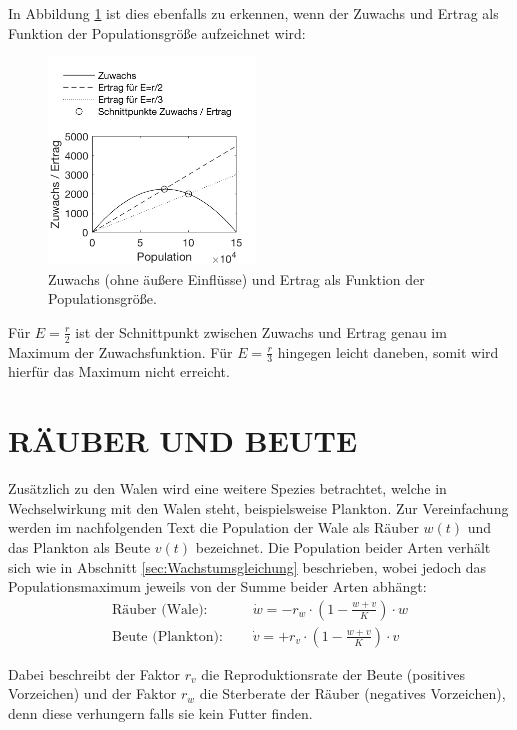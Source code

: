 \documentclass[a4paper,twoside]{article}
\begin{document}
	\newpage
	In Abbildung \ref{fig:zuwachs_ertrag_zu_population} ist dies ebenfalls zu erkennen, wenn der Zuwachs und Ertrag als Funktion der Populationsgröße aufzeichnet wird:
	\begin{figure}[!h]
  		\centering
 		\includegraphics[width=5.5cm]{Diagramme/zuwachs_ertrag_zu_population.png}
  		\caption{Zuwachs (ohne äußere Einflüsse) und Ertrag als Funktion der Populationsgröße.}
  		\label{fig:zuwachs_ertrag_zu_population}
	\end{figure}

	Für \(E=\frac{r}{2}\) ist der Schnittpunkt zwischen Zuwachs und Ertrag genau im Maximum der Zuwachsfunktion. Für \(E=\frac{r}{3}\) hingegen leicht daneben, somit wird hierfür das Maximum nicht erreicht.
	
	\section{\uppercase{Räuber und Beute}}\label{sec:Raeuber_Beute}
	
	Zusätzlich zu den Walen wird eine weitere Spezies betrachtet, welche in Wechselwirkung mit den Walen steht, beispielsweise Plankton. Zur Vereinfachung werden im nachfolgenden Text die Population der Wale als Räuber \(w(t)\) und das Plankton als Beute \(v(t)\) bezeichnet. Die Population beider Arten verhält sich wie in Abschnitt \ref{sec:Wachstumsgleichung} beschrieben, wobei jedoch das Populationsmaximum jeweils von der Summe beider Arten abhängt:
	\begin{align*}
		\textrm{Räuber (Wale): } &\quad \dot{w} = -r_w \cdot \left(1 - \frac{w+v}{K} \right) \cdot w \\
		\textrm{Beute (Plankton): } &\quad \dot{v} = +r_v \cdot \left(1 - \frac{w+v}{K} \right) \cdot v
	\end{align*}

	Dabei beschreibt der Faktor \(r_v\) die Reproduktionsrate der Beute (positives Vorzeichen) und der Faktor \(r_w\) die Sterberate der Räuber (negatives Vorzeichen), denn diese verhungern falls sie kein Futter finden.
\end{document}
